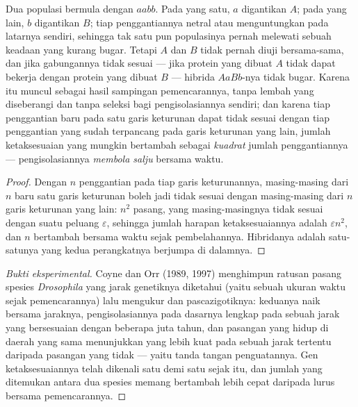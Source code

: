 \begin{theorem}\label{thm:b2:speciation:dm}
Dua populasi bermula dengan  $aabb$. Pada yang satu, $a$
digantikan $A$; pada yang lain, $b$ digantikan $B$; tiap penggantiannya
netral atau menguntungkan pada latarnya sendiri, sehingga tak satu pun
populasinya pernah melewati sebuah keadaan yang kurang bugar. Tetapi
$A$ dan $B$ tidak pernah diuji bersama-sama, dan jika gabungannya tidak
sesuai --- jika protein yang dibuat $A$ tidak dapat bekerja dengan
protein yang dibuat $B$ --- hibrida $AaBb$-nya tidak bugar. Karena itu
 muncul sebagai hasil sampingan pemencarannya,
tanpa lembah yang diseberangi dan tanpa seleksi bagi pengisolasiannya
sendiri; dan karena tiap penggantian baru pada satu garis keturunan
dapat tidak sesuai dengan tiap penggantian yang sudah terpancang pada
garis keturunan yang lain, jumlah ketaksesuaian yang mungkin bertambah
sebagai \emph{kuadrat} jumlah penggantiannya --- pengisolasiannya
\emph{membola salju} bersama waktu.
\end{theorem}
\begin{proof}
Dengan $n$ penggantian pada tiap garis keturunannya, masing-masing dari
$n$  baru satu garis keturunan boleh jadi tidak sesuai dengan
masing-masing dari $n$  garis keturunan yang lain: $n^{2}$ pasang,
yang masing-masingnya tidak sesuai dengan suatu peluang $\varepsilon$,
sehingga jumlah harapan ketaksesuaiannya adalah $\varepsilon n^{2}$,
dan $n$ bertambah bersama waktu sejak pembelahannya. Hibridanya adalah
satu-satunya  yang kedua perangkatnya berjumpa di dalamnya.
\end{proof}
\begin{proof}[Bukti eksperimental]
Coyne dan Orr (1989, 1997) menghimpun ratusan pasang spesies
\emph{Drosophila} yang jarak genetiknya diketahui (yaitu sebuah ukuran
waktu sejak pemencarannya) lalu mengukur  dan
pascazigotiknya: keduanya naik bersama jaraknya, pengisolasiannya pada
dasarnya lengkap pada sebuah jarak yang bersesuaian dengan beberapa
juta tahun, dan pasangan yang hidup di daerah yang sama menunjukkan
 yang lebih kuat pada sebuah jarak tertentu
daripada pasangan yang tidak --- yaitu tanda tangan penguatannya. Gen
ketaksesuaiannya telah dikenali satu demi satu sejak itu, dan jumlah
yang ditemukan antara dua spesies memang bertambah lebih cepat daripada
lurus bersama pemencarannya.
\end{proof}


